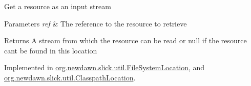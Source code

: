Get a resource as an input stream


\begin{DoxyParams}{Parameters}
{\em ref} & The reference to the resource to retrieve \\
\hline
\end{DoxyParams}
\begin{DoxyReturn}{Returns}
A stream from which the resource can be read or null if the resource can\textquotesingle{}t be found in this location 
\end{DoxyReturn}


Implemented in \mbox{\hyperlink{classorg_1_1newdawn_1_1slick_1_1util_1_1_file_system_location_a01200401dca18c8a89c2e866abcc48a3}{org.\+newdawn.\+slick.\+util.\+File\+System\+Location}}, and \mbox{\hyperlink{classorg_1_1newdawn_1_1slick_1_1util_1_1_classpath_location_a452b5faed4fb19992109e2a1d9109ee4}{org.\+newdawn.\+slick.\+util.\+Classpath\+Location}}.

